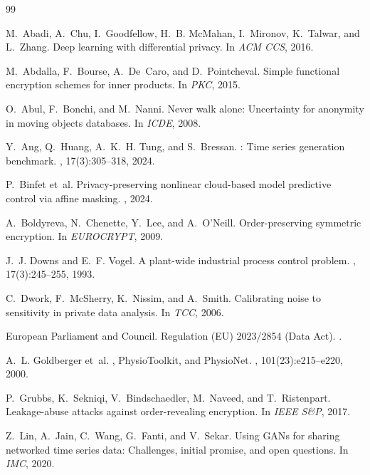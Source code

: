 \documentclass{article}
\theoremstyle{remark}
\begin{document}

\begin{thebibliography}{99}

M.~Abadi, A.~Chu, I.~Goodfellow, H.~B. McMahan, I.~Mironov, K.~Talwar, and L.~Zhang.
\newblock Deep learning with differential privacy.
\newblock In {\em ACM CCS}, 2016.

M.~Abdalla, F.~Bourse, A.~De~Caro, and D.~Pointcheval.
\newblock Simple functional encryption schemes for inner products.
\newblock In {\em PKC}, 2015.

O.~Abul, F.~Bonchi, and M.~Nanni.
\newblock Never walk alone: Uncertainty for anonymity in moving objects databases.
\newblock In {\em ICDE}, 2008.

Y.~Ang, Q.~Huang, A.~K.~H. Tung, and S.~Bressan.
: Time series generation benchmark.
, 17(3):305--318, 2024.

P.~Binfet et~al.
\newblock Privacy-preserving nonlinear cloud-based model predictive control via affine masking.
, 2024.

A.~Boldyreva, N.~Chenette, Y.~Lee, and A.~O'Neill.
\newblock Order-preserving symmetric encryption.
\newblock In {\em EUROCRYPT}, 2009.

J.~J. Downs and E.~F. Vogel.
\newblock A plant-wide industrial process control problem.
, 17(3):245--255, 1993.

C.~Dwork, F.~McSherry, K.~Nissim, and A.~Smith.
\newblock Calibrating noise to sensitivity in private data analysis.
\newblock In {\em TCC}, 2006.

European Parliament and Council.
\newblock Regulation ({EU}) 2023/2854 ({Data Act}).
.

A.~L. Goldberger et~al.
, {PhysioToolkit}, and {PhysioNet}.
, 101(23):e215--e220, 2000.

P.~Grubbs, K.~Sekniqi, V.~Bindschaedler, M.~Naveed, and T.~Ristenpart.
\newblock Leakage-abuse attacks against order-revealing encryption.
\newblock In {\em IEEE S\&P}, 2017.

Z.~Lin, A.~Jain, C.~Wang, G.~Fanti, and V.~Sekar.
\newblock Using {GAN}s for sharing networked time series data: Challenges, initial promise, and open questions.
\newblock In {\em IMC}, 2020.


\end{thebibliography}
\end{document}
